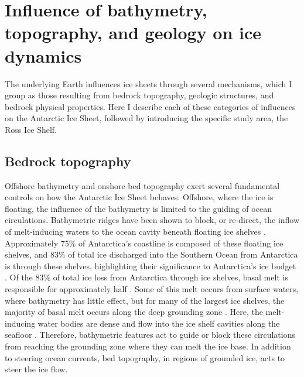 \section[Influences on ice dynamics]{Influence of bathymetry, topography, and geology on ice dynamics}

The underlying Earth influences ice sheets through several mechanisms, which I group as those resulting from bedrock topography, geologic structures, and bedrock physical properties. Here I describe each of these categories of influences on the Antarctic Ice Sheet, followed by introducing the specific study area, the Ross Ice Shelf.   

\subsection{Bedrock topography}


Offshore bathymetry and onshore bed topography exert several fundamental controls on how the Antarctic Ice Sheet behaves. Offshore, where the ice is floating, the influence of the bathymetry is limited to the guiding of ocean circulations. Bathymetric ridges have been shown to block, or re-direct, the inflow of melt-inducing waters to the ocean cavity beneath floating ice shelves \citep{derydtgeometric2014, zhaosillinfluenced2019, goldbergbathymetric2020}. Approximately 75\% of Antarctica's coastline is composed of these floating ice shelves, and 83\% of total ice discharged into the Southern Ocean from Antarctica is through these shelves, highlighting their significance to Antarctica's ice budget \citep{rignoticeshelf2013}. Of the 83\% of total ice loss from Antarctica through ice shelves, basal melt is responsible for approximately half \citep{greeneantarctic2022, rignoticeshelf2013}. Some of this melt occurs from surface waters, where bathymetry has little effect, but for many of the largest ice shelves, the majority of basal melt occurs along the deep grounding zone \citep{adusumilliinterannual2020}. Here, the melt-inducing water bodies are dense and flow into the ice shelf cavities along the seafloor \citep{hollandmodel2008, tintobathymetry2015}. Therefore, bathymetric features act to guide or block these circulations from reaching the grounding zone where they can melt the ice base. In addition to steering ocean currents, bed topography, in regions of grounded ice, acts to steer the ice flow. \\

